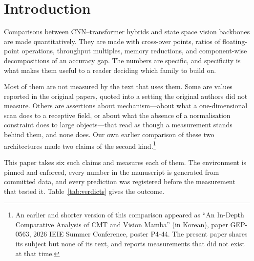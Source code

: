 \section{Introduction}
\label{sec:intro}

Comparisons between CNN--transformer hybrids and state space vision backbones
are made quantitatively. They are made with cross-over points, ratios of
floating-point operations, throughput multiples, memory reductions, and
component-wise decompositions of an accuracy gap. The numbers are specific,
and specificity is what makes them useful to a reader deciding which family
to build on.

Most of them are not measured by the text that uses them. Some are values
reported in the original papers, quoted into a setting the original authors
did not measure. Others are assertions about mechanism---about what a
one-dimensional scan does to a receptive field, or about what the absence of
a normalisation constraint does to large objects---that read as though a
measurement stands behind them, and none does. Our own earlier comparison of
these two architectures made two claims of the second kind.\footnote{An
earlier and shorter version of this comparison appeared as ``An In-Depth
Comparative Analysis of CMT and Vision Mamba'' (in Korean), paper GEP-0563,
2026 IEIE Summer Conference, poster P4-44. The present paper shares its
subject but none of its text, and reports measurements that did not exist at
that time.}

This paper takes six such claims and measures each of them. The environment
is pinned and enforced, every number in the manuscript is generated from
committed data, and every prediction was registered before the measurement
that tested it. Table~\ref{tab:verdicts} gives the outcome.

